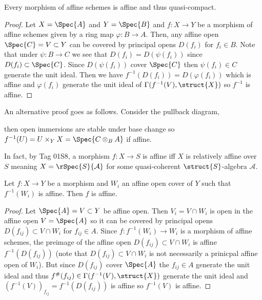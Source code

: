 \documentclass[12pt]{article}
\begin{document}
\begin{lemma}
Every morphism of affine schemes is affine and thus quasi-compact.
\end{lemma}

\begin{proof}
Let $X = \Spec{A}$ and $Y = \Spec{B}$ and $f : X \to Y$ be a morphism of affine schemes given by a ring map $\varphi : B \to A$. Then, any affine open $\Spec{C} = V \subset Y$ can be covered by principal opens $D(f_i)$ for $f_i \in B$. Note that under $\psi : B \to C$ we see that $D(f_i) = D(\psi(f_i))$ since $D(f_i) \subset \Spec{C}$. Since $D(\psi(f_i))$ cover $\Spec{C}$ then $\psi(f_i) \in C$ generate the unit ideal. Then we have $f^{-1}(D(f_i)) = D(\varphi(f_i))$ which is affine and $\varphi(f_i)$ generate the unit ideal of $\Gamma(f^{-1}(V), \struct{X})$ so $f^{-1}$ is affine.
\end{proof}

\begin{rmk}
An alternative proof goes as follows. Consider the pullback diagram,
\begin{center}
\end{center}
then open immersions are stable under base change so $f^{-1}(U) = U \times_Y X = \Spec{C \otimes_B A}$ if affine.
\end{rmk}

\begin{rmk}
In fact, by Tag 01S8, a morphism $f : X \to S$ is affine iff $X$ is relatively affine over $S$ meaning $X = \rSpec{S}{\mathcal{A}}$ for some quasi-coherent $\struct{S}$-algebra $\mathcal{A}$. 
\end{rmk}

\begin{lemma}
Let $f : X \to Y$ be a morphism and $W_i$ an affine open cover of $Y$ such that $f^{-1}(W_i)$ is affine. Then $f$ is affine.
\end{lemma}

\begin{proof}
Let $\Spec{A} = V \subset Y$ be affine open. Then $V_i = V \cap W_i$ is open in the affine open $V = \Spec{A}$ so it can be covered by principal opens $D(f_{ij}) \subset V \cap W_i$ for $f_{ij} \in A$. Since $f : f^{-1}(W_i) \to W_i$ is a morphism of affine schemes, the preimage of the affine open $D(f_{ij}) \subset V \cap W_i$ is affine $f^{-1}(D(f_{ij}))$ (note that $D(f_{ij}) \subset V \cap W_i$ is not necessarily a prinicpal affine open of $W_i$). But since $D(f_{ij})$ cover $\Spec{A}$ the $f_{ij} \in A$ generate the unit ideal and thus $f^\#(f_{ij}) \in \Gamma(f^{-1}(V), \struct{X})$ generate the unit ideal and $(f^{-1}(V))_{f_{ij}} = f^{-1}(D(f_{ij}))$ is affine so $f^{-1}(V)$ is affine.
\end{proof}
\end{document}
